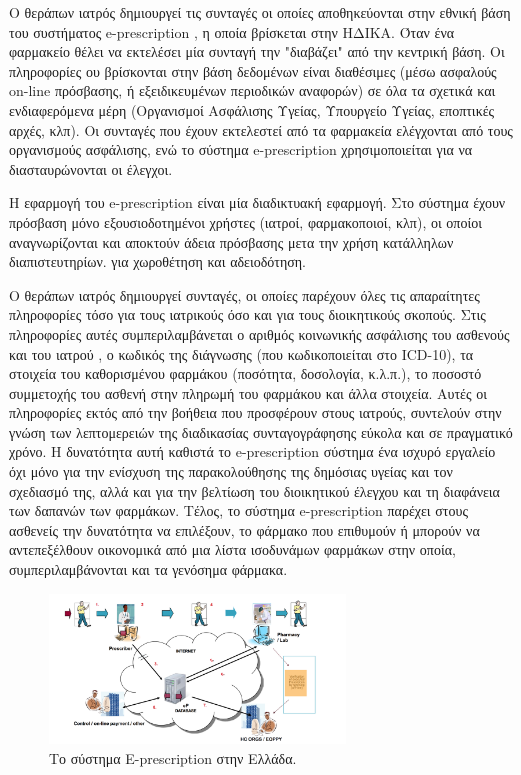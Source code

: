 		Ο θεράπων ιατρός δημιουργεί τις συνταγές οι οποίες αποθηκεύονται στην εθνική βάση του συστήματος e-prescription , η οποία βρίσκεται στην ΗΔΙΚΑ. \cite{idika}Όταν ένα φαρμακείο θέλει να εκτελέσει μία συνταγή την  "διαβάζει" από την κεντρική βάση. Οι πληροφορίες ου βρίσκονται στην βάση δεδομένων είναι διαθέσιμες (μέσω ασφαλούς on-line πρόσβασης, ή εξειδικευμένων περιοδικών αναφορών) σε όλα τα σχετικά και ενδιαφερόμενα μέρη (Οργανισμοί Ασφάλισης Υγείας, Υπουργείο Υγείας, εποπτικές αρχές, κλπ). Οι συνταγές που έχουν εκτελεστεί από τα φαρμακεία  ελέγχονται από τους οργανισμούς ασφάλισης, ενώ το σύστημα e-prescription χρησιμοποιείται για να διασταυρώνονται οι έλεγχοι. \cite{papala}

	Η εφαρμογή του e-prescription είναι μία διαδικτυακή εφαρμογή. Στο σύστημα έχουν πρόσβαση μόνο εξουσιοδοτημένοι χρήστες (ιατροί, φαρμακοποιοί, κλπ), οι οποίοι αναγνωρίζονται και αποκτούν άδεια πρόσβασης μετα την χρήση κατάλληλων διαπιστευτηρίων. για χωροθέτηση και αδειοδότηση.
	
	Ο θεράπων ιατρός δημιουργεί συνταγές, οι οποίες παρέχουν όλες τις απαραίτητες πληροφορίες τόσο για τους ιατρικούς όσο και για τους διοικητικούς σκοπούς.  Στις πληροφορίες αυτές συμπεριλαμβάνεται ο αριθμός κοινωνικής ασφάλισης  του ασθενούς και του ιατρού , ο κωδικός της διάγνωσης (που κωδικοποιείται στο ICD-10), τα στοιχεία του καθορισμένου φαρμάκου (ποσότητα, δοσολογία, κ.λ.π.), το ποσοστό συμμετοχής του ασθενή στην πληρωμή του φαρμάκου και άλλα στοιχεία.  Αυτές οι πληροφορίες εκτός από την βοήθεια που προσφέρουν στους ιατρούς, συντελούν στην γνώση των λεπτομερειών της διαδικασίας συνταγογράφησης εύκολα και σε πραγματικό χρόνο. Η δυνατότητα αυτή καθιστά το e-prescription σύστημα ένα ισχυρό εργαλείο όχι μόνο για την ενίσχυση της παρακολούθησης της δημόσιας υγείας και τον σχεδιασμό της, αλλά και για την βελτίωση του διοικητικού έλεγχου
και τη διαφάνεια των δαπανών των φαρμάκων. Τέλος, το σύστημα e-prescription παρέχει στους ασθενείς την δυνατότητα να  επιλέξουν, το φάρμακο που επιθυμούν ή μπορούν να αντεπεξέλθουν οικονομικά από μια λίστα ισοδυνάμων φαρμάκων στην οποία, συμπεριλαμβάνονται και τα γενόσημα φάρμακα. 

	\begin{figure}[h]
	    \centering
	    \includegraphics[width=0.7\textwidth]{e-prescr.png}
	    \caption{Το σύστημα E-prescription στην Ελλάδα. }
	    \label{fig:prescr}
	\end{figure}


